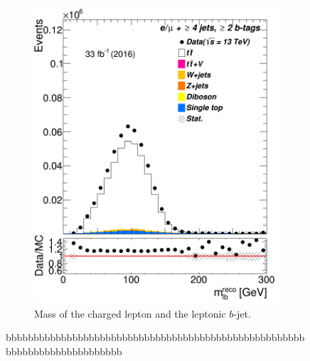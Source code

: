 \begin{figure}
\begin{subfigure}{0.35\textwidth}
		\includegraphics[width=\linewidth]{ControlPlots_emujets_2016_4incl_2incl/klf_original_mlb_reco_emujets_2016.png}
		\caption{Mass of the charged lepton and the leptonic $b$-jet.} \label{fig:klf17}
	\end{subfigure}
	
	
	\caption{bbbbbbbbbbbbbbbbbbbbbbbbbbbbbbbbbbbbbbbbbbbbbbbbbbbbbbbbbbbbbbbbbbbbbbbbbbb}
\end{figure}	




